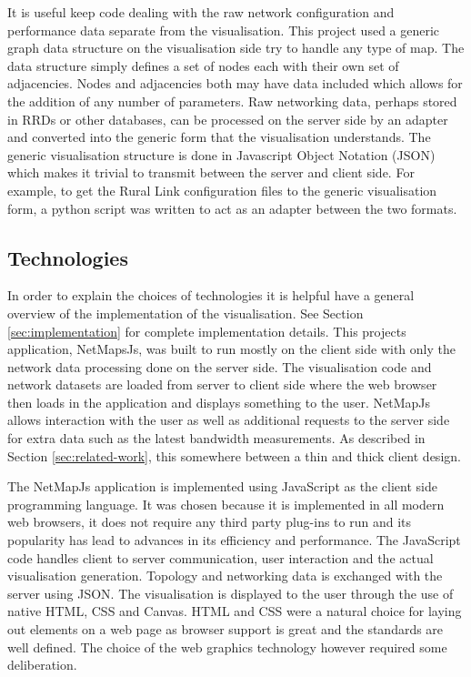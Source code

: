 \documentclass[11pt, a4paper]{article}
\begin{document}
It is useful keep code dealing with the raw network configuration and
performance data separate from the visualisation. This project used a generic
graph data structure on the visualisation side try to handle any type of map.
The data structure simply defines a set of nodes each with their own set of
adjacencies. Nodes and adjacencies both may have data included which allows for
the addition of any number of parameters. Raw networking data, perhaps stored in
RRDs or other databases, can be processed on the server side by an adapter and
converted into the generic form that the visualisation understands.  The generic
visualisation structure is done in Javascript Object Notation (JSON) which makes
it trivial to transmit between the server and client side.\cite{rfc4627}  For
example, to get the Rural Link configuration files to the generic visualisation
form, a python script was written to act as an adapter between the two formats. 


\subsection{Technologies}
\label{sec:technologies}

In order to explain the choices of technologies it is helpful have a general
overview of the implementation of the visualisation. See Section
\ref{sec:implementation} for complete implementation details. This projects
application, NetMapsJs, was built to run mostly on the client side with only the
network data processing done on the server side. The visualisation code and
network datasets are loaded from server to client side where the web browser
then loads in the application and displays something to the user. NetMapJs
allows interaction with the user as well as additional requests to the server
side for extra data such as the latest bandwidth measurements. As described in
Section \ref{sec:related-work}, this somewhere between a thin and thick client
design.

The NetMapJs application is implemented using JavaScript as the client side
programming language. It was chosen because it is implemented in all modern web
browsers, it does not require any third party plug-ins to run and its popularity
has lead to advances in its efficiency and performance. The JavaScript code
handles client to server communication, user interaction and the actual
visualisation generation. Topology and networking data is exchanged with the
server using JSON. The visualisation is displayed to the user through the use of
native HTML, CSS and Canvas. HTML and CSS were a natural choice for laying out
elements on a web page as browser support is great and the standards are well
defined. The choice of the web graphics technology however required some
deliberation. 
\end{document}
